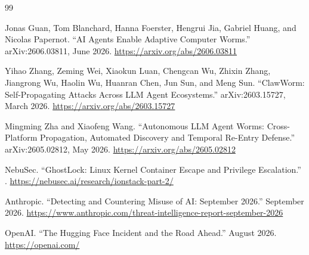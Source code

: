 \documentclass[11pt,a4paper]{article}
\begin{document}
\begin{thebibliography}{99}

Jonas Guan, Tom Blanchard, Hanna Foerster, Hengrui Jia, Gabriel Huang, and
Nicolas Papernot.
\newblock ``AI Agents Enable Adaptive Computer Worms.''
\newblock arXiv:2606.03811, June 2026.
\newblock \url{https://arxiv.org/abs/2606.03811}

Yihao Zhang, Zeming Wei, Xiaokun Luan, Chengcan Wu, Zhixin Zhang,
Jiangrong Wu, Haolin Wu, Huanran Chen, Jun Sun, and Meng Sun.
\newblock ``ClawWorm: Self-Propagating Attacks Across LLM Agent Ecosystems.''
\newblock arXiv:2603.15727, March 2026.
\newblock \url{https://arxiv.org/abs/2603.15727}

Mingming Zha and Xiaofeng Wang.
\newblock ``Autonomous LLM Agent Worms: Cross-Platform Propagation,
Automated Discovery and Temporal Re-Entry Defense.''
\newblock arXiv:2605.02812, May 2026.
\newblock \url{https://arxiv.org/abs/2605.02812}

NebuSec.
\newblock ``GhostLock: Linux Kernel Container Escape and Privilege
Escalation.''
.
\newblock \url{https://nebusec.ai/research/ionstack-part-2/}

Anthropic.
\newblock ``Detecting and Countering Misuse of AI: September 2026.''
\newblock September 2026.
\newblock
\url{https://www.anthropic.com/threat-intelligence-report-september-2026}

OpenAI.
\newblock ``The Hugging Face Incident and the Road Ahead.''
\newblock August 2026.
\newblock \url{https://openai.com/}

\end{thebibliography}
\end{document}

